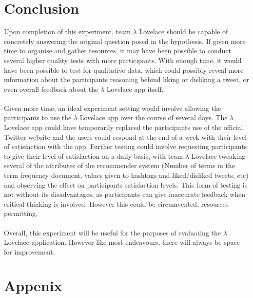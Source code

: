 \documentclass{article}
\begin{document}
\section{Conclusion}
%
%
Upon completion of this experiment, team $\lambda$ Lovelace should be capable of concretely answering the original question posed in the hypothesis. If given more time to organise and gather resources, it may have been possible to conduct several higher quality tests with more participants. With enough time, it would have been possible to test for qualitative data, which could possibly reveal more information about the participants reasoning behind liking or disliking a tweet, or even overall feedback about the $\lambda$ Lovelace app itself.
\\\\
Given more time, an ideal experiment setting would involve allowing the participants to use the $\lambda$ Lovelace app over the course of several days. The $\lambda$ Lovelace app could have temporarily replaced the participants use of the official Twitter website and the users could respond at the end of a week with their level of satisfaction with the app. Further testing could involve requesting participants to give their level of satisfaction on a daily basis, with team $\lambda$ Lovelace tweaking several of the attributes of the recommender system (Number of terms in the term frequency document, values given to hashtags and liked/disliked tweets, etc) and observing the effect on participants satisfaction levels. This form of testing is not without its disadvantages, as participants can give inaccurate feedback when critical thinking is involved. However this could be circumvented, resources permitting.
\\\\
Overall, this experiment will be useful for the purposes of evaluating the $\lambda$ Lovelace application. However like most endeavours, there will always be space for improvement. 


\newpage


\section{Appenix}
\end{document}

